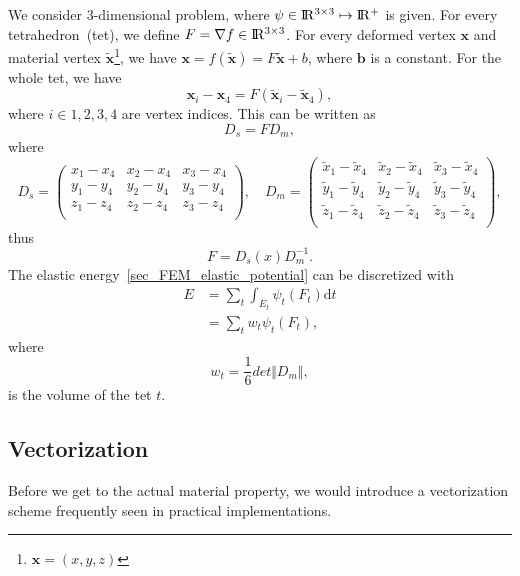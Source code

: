 \documentclass{fancydoc}
\newcommand{\diffd}{\mathrm{d}}
\newcommand{\realR}{\rm I\!R}
\begin{document}
We consider 3-dimensional problem, where $\psi \in \realR^{3\times 3} \mapsto \realR^+$ is given. For every tetrahedron~(tet), we define $F = \nabla f \in \realR^{3 \times 3}$. For every deformed vertex $\mathbf{x}$ and material vertex $\tilde{\mathbf{x}}$\footnote{$\mathbf{x} = (x, y, z)$}, we have $\mathbf{x} = f(\tilde{\mathbf{x}}) = F\tilde{\mathbf{x}} + b$, where $\mathbf{b}$ is a constant. For the whole tet, we have
\begin{equation}
\mathbf{x}_i - \mathbf{x}_4 = F(\tilde{\mathbf{x}}_i - \tilde{\mathbf{x}}_4),
\end{equation}
where $i \in {1,2,3,4}$ are vertex indices. This can be written as
\begin{equation}
D_s = F D_m,
\end{equation}
where 
\begin{equation}
D_s = \begin{pmatrix}
x_1 - x_4 & x_2 - x_4 & x_3 - x_4 \\
y_1 - y_4 & y_2 - y_4 & y_3 - y_4 \\
z_1 - z_4 & z_2 - z_4 & z_3 - z_4 \\
\end{pmatrix}, \quad
D_m= \begin{pmatrix}
\tilde{x}_1 - \tilde{x}_4 & \tilde{x}_2 - \tilde{x}_4 & \tilde{x}_3 - \tilde{x}_4 \\
\tilde{y}_1 - \tilde{y}_4 & \tilde{y}_2 - \tilde{y}_4 & \tilde{y}_3 - \tilde{y}_4 \\
\tilde{z}_1 - \tilde{z}_4 & \tilde{z}_2 - \tilde{z}_4 & \tilde{z}_3 - \tilde{z}_4 \\
\end{pmatrix},
\end{equation}
thus
\begin{equation}
F = D_s(x)D_m^{-1}.
\end{equation}
The elastic energy~\eqref{sec_FEM_elastic_potential} can be discretized with
\begin{subequations}
\begin{align}
E &= \sum_t \int_{E_t} \psi_t(F_t) \diffd t\\
  &= \sum_t w_t\psi_t(F_t),
\end{align}
\end{subequations}
where
\begin{equation}
w_t = \frac{1}{6} det\Vert D_m\Vert,
\end{equation}
is the volume of the tet $t$.

\subsection{Vectorization}
Before we get to the actual material property, we would introduce a vectorization scheme frequently seen in practical implementations.
\end{document}
